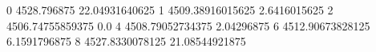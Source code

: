 0 4528.796875 22.04931640625
1 4509.38916015625 2.6416015625
2 4506.74755859375 0.0
4 4508.79052734375 2.04296875
6 4512.90673828125 6.1591796875
8 4527.8330078125 21.08544921875
